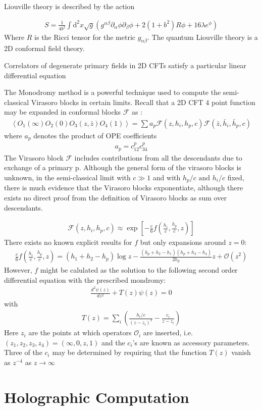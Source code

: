 Liouville theory is described by the action

\begin{align}
 S= \frac{1}{4b^2} \int \mathrm{d}^2x  \sqrt{g} \left( g^{\alpha \beta} \partial_\alpha \phi \partial_\beta \phi + 2(1+b^2) R \phi + 16\lambda e^\phi\right)
\end{align}
Where $R$ is the Ricci tensor for the metric $g_{\alpha\beta}$. The quantum Liouville theory is a 2D conformal field theory.  
  
  Correlators of degenerate primary fields in 2D CFTs satisfy a particular linear differential equation
  
  
  
  The Monodromy method is a powerful technique used to compute the semi-classical Virasoro blocks in certain limits. Recall that a 2D CFT 4 point function may be expanded in conformal blocks $\mathcal{F}$ as :
  \begin{align}
  \left\langle O_1(\infty) O_2(0) O_3(z,\bar{z}) O_4(1)\right\rangle = \sum a_p \mathcal{F}(z,h_i,h_p,c) \mathcal{F}(\bar{z},\bar{h}_i,\bar{h}_p,c)
  \end{align}
  where $a_p$ denotes the product of OPE coefficients
  \begin{align}
   a_p = c_{12}^p c_{34}^p
  \end{align}
  The Virasoro block $\mathcal{F}$ includes contributions from all the descendants due to exchange of a primary p. Although the general form of the virasoro blocks is unknown, in the semi-classical limit with $c \gg 1$ and with $h_p/c \text{ and } h_i/c$ fixed, there is much evidence that the Virasoro blocks exponentiate, although there exists no direct proof from the definition of Virasoro blocks as sum over descendants.
  
  \begin{align}
   \mathcal{F}(z,h_i,h_p,c) \approx \exp \left[-\frac{c}{6} f\left( \frac{h_i}{c}, \frac{h_p}{c}, z\right)\right]
  \end{align}
  There exists no known explicit results for $f$ but only expansions around $z=0$:
  \begin{align}
   \frac{c}{6} f\left( \frac{h_i}{c}, \frac{h_p}{c}, z\right) = (h_1 + h_2 - h_p) \log z - \frac{(h_p +h_2 - h_1)(h_p + h_3 - h_4)}{2h_p} z + \mathcal{O} (z^2)
  \end{align}
  However, $f$ might be calulated as the solution to the following second order differential equation with the prescribed mondromy:
  \begin{align}
   \frac{d^2 \psi(z)}{dz^2} + T(z)\psi(z) =0
  \end{align}
with
\begin{align}
 T(z) = \sum_i \left(\frac{h_i/c}{(z-z_i)^2} - \frac{c_i}{z-z_i} \right)
\end{align}
Here $z_i$ are the points at which operators $\mathcal{O}_i$ are inserted, i.e. $(z_1,z_2,z_3,z_4)= (\infty,0,z,1)$ and the $c_i$'s are known as accessory parameters. Three of the $c_i$ may be determined by requiring that the function $T(z)$ vanish as $z^{-4}$ as $z \to \infty$
  
  
  \section{Holographic Computation} \label{sec:num1}